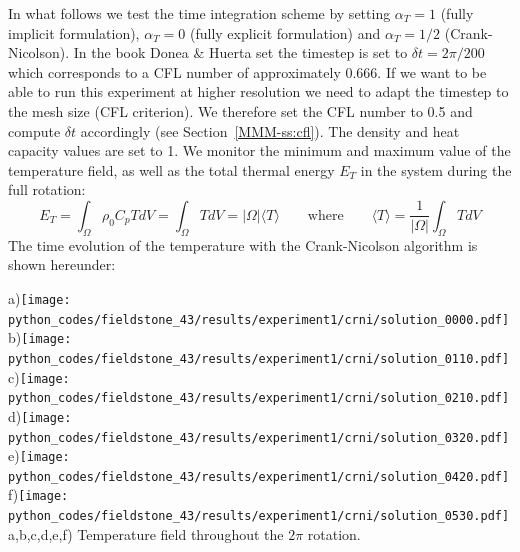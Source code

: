 In what follows we test the time integration scheme by setting $\alpha_T=1$ 
(fully implicit formulation), $\alpha_T=0$ (fully explicit formulation) and $\alpha_T=1/2$ (Crank-Nicolson).  
In the book Donea \& Huerta set the timestep is set to $\delta t=2\pi/200$ which corresponds 
to a CFL number of approximately 0.666. If we want to be able to run this experiment at higher 
resolution we need to adapt the timestep to the mesh size (CFL criterion). We 
therefore set the CFL number to 0.5 and compute $\delta t$ 
accordingly (see Section~\ref{MMM-ss:cfl}).  
The density and heat capacity values are set to 1. We monitor the minimum 
and maximum value of the temperature field, as well as the total thermal energy $E_T$ in the 
system during the full rotation:
\[
E_T=\int_\Omega \rho_0 C_p T dV = \int_\Omega T dV = |\Omega| \langle T \rangle 
\qquad
\text{where}
\qquad
\langle T \rangle = \frac{1}{|\Omega|} \int_\Omega T dV
\]
The time evolution of the temperature with the Crank-Nicolson algorithm is shown hereunder:
\begin{center}
a)\texttt{[image: python\_codes/fieldstone\_43/results/experiment1/crni/solution\_0000.pdf]}
b)\texttt{[image: python\_codes/fieldstone\_43/results/experiment1/crni/solution\_0110.pdf]}
c)\texttt{[image: python\_codes/fieldstone\_43/results/experiment1/crni/solution\_0210.pdf]}
d)\texttt{[image: python\_codes/fieldstone\_43/results/experiment1/crni/solution\_0320.pdf]}
e)\texttt{[image: python\_codes/fieldstone\_43/results/experiment1/crni/solution\_0420.pdf]}
f)\texttt{[image: python\_codes/fieldstone\_43/results/experiment1/crni/solution\_0530.pdf]}\\
{\captionfont a,b,c,d,e,f) Temperature field throughout the $2\pi$ rotation.} 
\end{center}

\vspace{.4cm}

